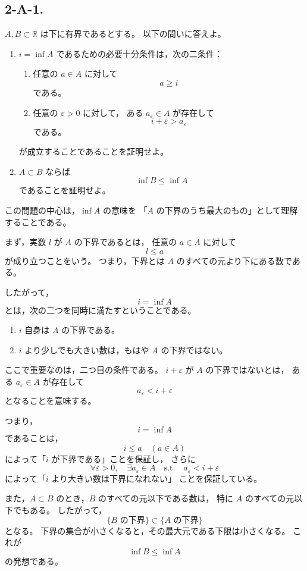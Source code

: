 \subsection{2-A-1.}
\begin{exercise}
	\(A,B\subset\mathbb{R}\) は下に有界であるとする。
	以下の問いに答えよ。
	
	\begin{enumerate}
		\item
		\(i=\inf A\) であるための必要十分条件は，次の二条件：
		\begin{enumerate}
			\item
			任意の \(a\in A\) に対して
			\[
			a\geq i
			\]
			である。
			
			\item
			任意の \(\varepsilon>0\) に対して，
			ある \(a_\varepsilon\in A\) が存在して
			\[
			i+\varepsilon>a_\varepsilon
			\]
			である。
		\end{enumerate}
		が成立することであることを証明せよ。
		
		\item
		\(A\subset B\) ならば
		\[
		\inf B\leq \inf A
		\]
		であることを証明せよ。
	\end{enumerate}
\end{exercise}

\begin{background}
	この問題の中心は，\(\inf A\) の意味を
	「\(A\) の下界のうち最大のもの」として理解することである。
	
	まず，実数 \(l\) が \(A\) の下界であるとは，
	任意の \(a\in A\) に対して
	\[
	l\leq a
	\]
	が成り立つことをいう。
	つまり，下界とは \(A\) のすべての元より下にある数である。
	
	したがって，
	\[
	i=\inf A
	\]
	とは，次の二つを同時に満たすということである。
	
	\begin{enumerate}
		\item
		\(i\) 自身は \(A\) の下界である。
		
		\item
		\(i\) より少しでも大きい数は，もはや \(A\) の下界ではない。
	\end{enumerate}
	
	ここで重要なのは，二つ目の条件である。
	\(i+\varepsilon\) が \(A\) の下界ではないとは，
	ある \(a_\varepsilon\in A\) が存在して
	\[
	a_\varepsilon<i+\varepsilon
	\]
	となることを意味する。
	
	つまり，
	\[
	i=\inf A
	\]
	であることは，
	\[
	i\leq a \quad (a\in A)
	\]
	によって「\(i\) が下界である」ことを保証し，
	さらに
	\[
	\forall \varepsilon>0,\quad
	\exists a_\varepsilon\in A
	\quad\text{s.t.}\quad
	a_\varepsilon<i+\varepsilon
	\]
	によって「\(i\) より大きい数は下界になれない」
	ことを保証している。
	
	また，\(A\subset B\) のとき，\(B\) のすべての元以下である数は，
	特に \(A\) のすべての元以下でもある。
	したがって，
	\[
	\{\text{\(B\) の下界}\}
	\subset
	\{\text{\(A\) の下界}\}
	\]
	となる。
	下界の集合が小さくなると，その最大元である下限は小さくなる。
	これが
	\[
	\inf B\leq \inf A
	\]
	の発想である。
\end{background}

